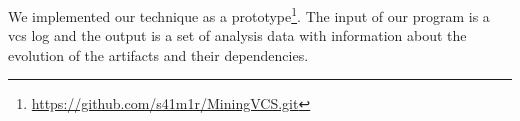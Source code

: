 We implemented our technique as a prototype\footnote{\url{https://github.com/s41m1r/MiningVCS.git}}. The input of our program is a \gls{vcs} log and the output is a set of analysis data with information about the evolution of the artifacts and their dependencies. 
%
%
%
%
%
%



